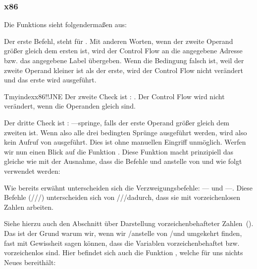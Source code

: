 \subsubsection{x86}


Die Funktions  sieht folgendermaßen aus:



Der erste Befehl, \JLE steht für .
Mit anderen Worten, wenn der zweite Operand größer gleich dem ersten ist, wird der Control Flow an die angegebene
Adresse bzw. das angegebene Label übergeben.
Wenn die Bedingung falsch ist, weil der zweite Operand kleiner ist als der erste, wird der Control Flow nicht verändert
und das erste \printf wird ausgeführt.

Tmyindex{x86!\Instructions!JNE}
Der zweite Check ist \JNE: .
Der Control Flow wird nicht verändert, wenn die Operanden gleich sind.

Der dritte Check ist \JGE: ---springe, falls der erste Operand größer gleich dem zweiten
ist.
Wenn also alle drei bedingten Sprünge ausgeführt werden, wird also kein Aufruf von \printf ausgeführt.
Dies ist ohne manuellen Eingriff unmöglich.
Werfen wir nun einen Blick auf die Funktion .
Diese Funktion macht prinzipiell das gleiche wie  mit der Ausnahme, dass die Befehle \JBE und \JAE
anstelle von \JLE und \JGE wie folgt verwendet werden:



Wie bereits erwähnt unterscheiden sich die Verzweigungsbefehle:
\JBE--- und \JAE---.
Diese Befehle (\JA/\JAE/\JB/\JBE) unterscheiden sich von \JG/\JGE/\JL/\JLE dadurch, dass sie mit vorzeichenlosen Zahlen
arbeiten.

Siehe hierzu auch den Abschnitt über Darstellung vorzeichenbehafteter Zahlen~().
Das ist der Grund warum wir, wenn wir \JG/\JL anstelle von \JA/\JB und umgekehrt finden, fast mit Gewissheit sagen
können, dass die Variablen vorzeichenbehaftet bzw. vorzeichenlos sind.
Hier befindet sich auch die Funktion \main, welche für uns nichts Neues bereithält:

